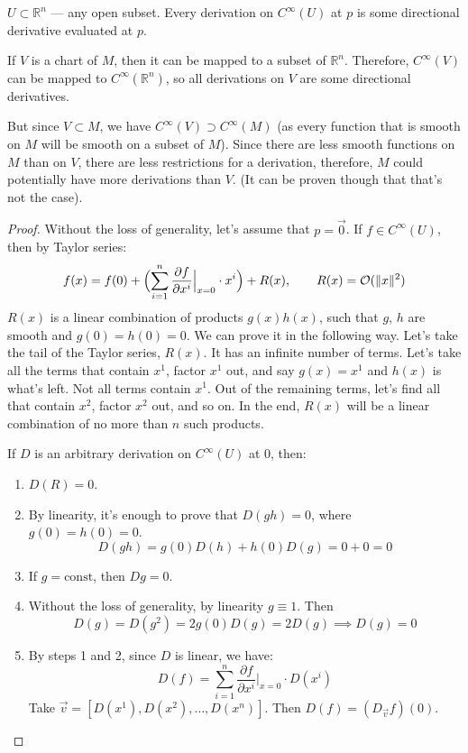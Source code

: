 \begin{lemma}
    $U \subset \mathbb{R}^n$ --- any open subset.
    Every derivation on $C^\infty(U)$ at $p$ is some directional
    derivative evaluated at $p$.
\end{lemma}
\begin{remark}
    If $V$ is a chart of $M$, then it can be mapped to a subset of $\mathbb{R}^n$.
    Therefore, $C^\infty(V)$ can be mapped to $C^\infty(\mathbb{R}^n)$,
    so all derivations on $V$ are some directional derivatives.

    But since $V \subset M$, we have $C^\infty(V) \supset C^\infty(M)$
    (as every function that is smooth on $M$ will be smooth on a subset of $M$).
    Since there are less smooth functions on $M$ than on $V$, 
    there are less restrictions for a derivation, therefore, $M$
    could potentially have more derivations than $V$. (It can be proven though
    that that's not the case).
\end{remark}
\begin{proof}
    Without the loss of generality, let's assume that $p = \vec{0}$.
    If $f \in C^\infty(U)$, then by Taylor series:
    \[
        f(x) = f(0) + 
        \Bigl(\sum_{i=1}^n \frac{\partial f}{\partial x^i}\Big|_{x=0} \cdot x^i \Bigr)
        + R(x), \qquad R(x) = \mathcal{O}(\lVert x\rVert^2)
    \]
    $R(x)$ is a linear combination of products $g(x) h(x)$, such that $g$, $h$ are smooth and $g(0) = h(0) = 0$.
    We can prove it in the following way. Let's take the tail of the Taylor series, $R(x)$. It has an infinite number of terms.
    Let's take all the terms that contain $x^1$, factor $x^1$ out, and say $g(x) = x^1$ and $h(x)$ is what's left.
    Not all terms contain $x^1$. Out of the remaining terms, let's find all that contain $x^2$, factor $x^2$ out, and so on.
    In the end, $R(x)$ will be a linear combination of no more than $n$ such products.
    
    If $D$ is an arbitrary derivation on $C^\infty(U)$ at 0, then:
    \begin{enumerate}
        \item[Step 1.] {
            $D(R) = 0$.
        }
        \item[Proof.] {
            By linearity, it's enough to prove that $D(gh) = 0$, where
            $g(0) = h(0) = 0$.
            \[ D(gh) = g(0) D(h) + h(0) D(g) = 0 + 0 = 0 \]
        }
        \item[Step 2.] {
            If $g = \text{const}$, then $Dg = 0$.
        }
        \item[Proof.] {
            Without the loss of generality, by linearity $g \equiv 1$. Then
            \[ D(g) = D(g^2) = 2g(0) D(g) = 2D(g) \implies D(g) = 0 \]
        }
        \item[Step 3.] {
            By steps 1 and 2, since $D$ is linear, we have:
            \[ 
                D(f) = \sum_{i=1}^n \frac{\partial f}{\partial x^i} \Big|_{x=0}
                \cdot D(x^i)
            \]
            Take $\vec{v} = [D(x^1), D(x^2), \dots, D(x^n)]$. Then
            $D(f) = (D_{\vec{v}} f)(0)$.
        }
    \end{enumerate}
\end{proof}

